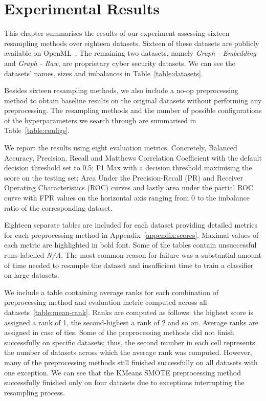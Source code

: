\chapter{Experimental Results}
\label{chapter:results}

This chapter summarises the results of our experiment assessing sixteen resampling methods over
eighteen datasets. Sixteen of these datasets are publicly available on OpenML~\cite{openml}. The
remaining two datasets, namely \emph{Graph - Embedding} and \emph{Graph - Raw}, are proprietary
cyber security datasets. We can see the datasets' names, sizes and imbalances in
Table~\ref{table:datasets}.



Besides sixteen resampling methods, we also include a no-op preprocessing method to obtain baseline
results on the original datasets without performing any preprocessing. The resampling methods and
the number of possible configurations of the hyperparameters we search through are summarised in
Table~\ref{table:configs}.



We report the results using eight evaluation metrics. Concretely, Balanced Accuracy, Precision,
Recall and Matthews Correlation Coefficient with the default decision threshold set to 0.5; F1 Max
with a decision threshold maximising the score on the testing set; Area Under the Precision-Recall
(PR) and Receiver Operating Characteristics (ROC) curves and lastly area under the partial ROC
curve with FPR values on the horizontal axis ranging from 0 to the imbalance ratio of the
corresponding dataset.

Eighteen separate tables are included for each dataset providing detailed metrics for each
preprocessing method in Appendix~\ref{appendix:scores}. Maximal values of each metric are
highlighted in bold font. Some of the tables contain unsuccessful runs labelled \emph{N/A}. The
most common reason for failure was a substantial amount of time needed to resample the dataset and
insufficient time to train a classifier on large datasets.

We include a table containing average ranks for each combination of preprocessing method and
evaluation metric computed across all datasets~\ref{table:mean-rank}. Ranks are computed as
follows: the highest score is assigned a rank of 1, the second-highest a rank of 2 and so on.
Average ranks are assigned in case of ties. Some of the preprocessing methods did not finish
successfully on specific datasets; thus, the second number in each cell represents the number of
datasets across which the average rank was computed. However, many of the preprocessing methods
still finished successfully on all datasets with one exception. We can see that the KMeans SMOTE
preprocessing method successfully finished only on four datasets due to exceptions interrupting the
resampling process.

